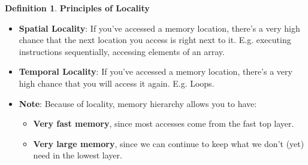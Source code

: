 \documentclass[11pt,a4paper]{article}
\theoremstyle{definition}
\newtheorem{definition}{Definition}[section]
\newenvironment{myitemize}
{ \begin{itemize}
    \setlength{\itemsep}{5pt}
    \setlength{\parskip}{0pt}
    \setlength{\parsep}{0pt}     }
{ \end{itemize}                  }
\begin{document}
\begin{definition}{\textbf{Principles of Locality}}
	\begin{myitemize}
		\item \textbf{Spatial Locality}: If you've accessed a memory location, there's a very high chance that the next location you access is right next to it. E.g. executing instructions sequentially, accessing elements of an array.
		\item \textbf{Temporal Locality}: If you've accessed a memory location, there's a very high chance that you will access it again. E.g. Loops.
		\item \textbf{Note}: Because of locality, memory hierarchy allows you to have:
		\begin{myitemize}
			\item \textbf{Very fast memory}, since most accesses come from the fast top layer.
			\item \textbf{Very large memory}, since we can continue to keep what we don't (yet) need in the lowest layer.
		\end{myitemize}
	\end{myitemize}
\end{definition}
\end{document}
